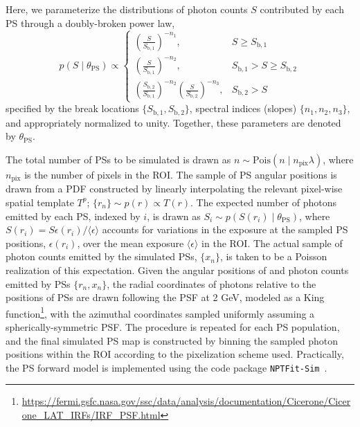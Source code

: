 \documentclass[prd,aps,10pt,nofootinbib,twocolumn,superscriptaddress,preprintnumbers,balancelastpage,longbibliography]{revtex4-1}
\begin{document}
Here, we parameterize the distributions of photon counts $S$ contributed by each PS through a doubly-broken power law,
\begin{equation}
\label{eq:scd_bpl}
p(S\mid\theta_\mathrm{PS})\propto \left\{\begin{array}{lc}
\left(\frac{S}{S_{\mathrm b, 1}}\right)^{-n_{1}}, & S \geq S_{\mathrm b, 1} \\
\left(\frac{S}{S_{\mathrm b, 1}}\right)^{-n_{2}}, & S_{\mathrm b, 1}>S \geq S_{\mathrm b, 2} \\
\left(\frac{S_{\mathrm b, 2}}{S_{\mathrm b, 1}}\right)^{-n_{2}}\left(\frac{S}{S_{\mathrm b, 2}}\right)^{-n_{3}}, & S_{\mathrm b, 2}>S
\end{array}\right.
\end{equation}
specified by the break locations $\{S_{\mathrm b, 1}, S_{\mathrm b, 2}\}$, spectral indices (slopes) $\{n_1, n_2, n_3\}$, and appropriately normalized to unity. Together, these parameters are denoted by $\theta_\mathrm{PS}$.

The total number of PSs to be simulated is drawn as $n \sim \mathrm{Pois}(n\mid n_\mathrm{pix}\lambda)$, where $n_\mathrm{pix}$ is the number of pixels in the ROI. The sample of PS angular positions is drawn from a PDF constructed by linearly interpolating the relevant pixel-wise spatial template $T^p$; $\{r_n\} \sim p(r) \propto T(r)$. The expected number of photons emitted by each PS, indexed by $i$, is drawn as $S_i \sim p\left({S(r_i)}\mid\theta_\mathrm{PS}\right)$, where ${S(r_i)} = S \epsilon(r_i) / \langle \epsilon \rangle$ accounts for variations in the \Fermi exposure at the sampled PS positions, $\epsilon(r_i)$, over the mean exposure $\langle \epsilon \rangle$ in the ROI. The actual sample of photon counts emitted by the simulated PSs, $\{x_n\}$, is taken to be a Poisson realization of this expectation. Given the angular positions of and photon counts emitted by PSs $\{r_n, x_n\}$, the radial coordinates of photons relative to the positions of PSs are drawn following the \Fermi PSF at 2 GeV, modeled as a King function\footnote{\url{https://fermi.gsfc.nasa.gov/ssc/data/analysis/documentation/Cicerone/Cicerone_LAT_IRFs/IRF_PSF.html}}, with the azimuthal coordinates sampled uniformly assuming a spherically-symmetric PSF. The procedure is repeated for each PS population, and the final simulated PS map is constructed by binning the sampled photon positions within the ROI according to the pixelization scheme used. Practically, the PS forward model is implemented using the code package \texttt{NPTFit-Sim}~\cite{NPTFit-Sim}.
\end{document}
